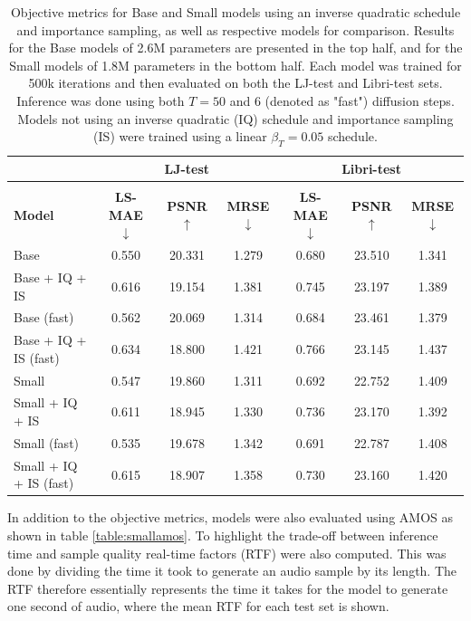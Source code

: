 \documentclass{report}
\begin{document}
\begin{table}[H]
\centering
\def\arraystretch{1.3}
\begin{tabular}{l | c c c | c c c }
\hline
 & \multicolumn{3}{c|}{\textbf{LJ-test}} & \multicolumn{3}{c}{\textbf{Libri-test}} \\
\hline\hline
\vspace{-0.5cm} \\
\textbf{Model} & \textbf{LS-MAE} $\downarrow$ & \textbf{PSNR} $\uparrow$ & \textbf{MRSE} $\downarrow$ & \textbf{LS-MAE} $\downarrow$ & \textbf{PSNR} $\uparrow$ & \textbf{MRSE} $\downarrow$ \\ [0.5ex]
\hline
Base  & 0.550 & 20.331 & 1.279 & 0.680 & 23.510 & 1.341   \\
\hline
Base + IQ + IS  & 0.616 & 19.154 & 1.381 & 0.745 & 23.197 & 1.389 \\
\hline
Base (fast) & 0.562 & 20.069 & 1.314 & 0.684 & 23.461 & 1.379   \\
\hline
Base + IQ + IS (fast)  & 0.634 & 18.800 & 1.421 & 0.766 & 23.145 & 1.437 \\
\hline
\hline
Small  & 0.547 & 19.860 & 1.311 & 0.692 & 22.752 & 1.409 \\
\hline
Small + IQ + IS & 0.611 & 18.945 & 1.330 & 0.736 & 23.170 & 1.392 \\
\hline
Small (fast) & 0.535 & 19.678 & 1.342 & 0.691 & 22.787 & 1.408 \\
\hline
Small + IQ + IS (fast) & 0.615 & 18.907 & 1.358 & 0.730 & 23.160 & 1.420 \\
\hline\hline
\end{tabular}
\caption{\onehalfspacing Objective metrics for Base and Small models using an inverse quadratic schedule and importance sampling, as well as respective models for comparison. Results for the Base models of 2.6M parameters are presented in the top half, and for the Small models of 1.8M parameters in the bottom half. Each model was trained for 500k iterations and then evaluated on both the LJ-test and Libri-test sets. Inference was done using both $T=50$ and $6$ (denoted as "fast") diffusion steps. Models not using an inverse quadratic (IQ) schedule and importance sampling (IS) were trained using a linear $\beta_T=0.05$ schedule.}
\label{table:smallstats}
\end{table}

In addition to the objective metrics, models were also evaluated using AMOS as shown in table \ref{table:smallamos}. To highlight the trade-off between inference time and sample quality real-time factors (RTF) were also computed. This was done by dividing the time it took to generate an audio sample by its length. The RTF therefore essentially represents the time it takes for the model to generate one second of audio, where the mean RTF for each test set is shown. 
\end{document}

